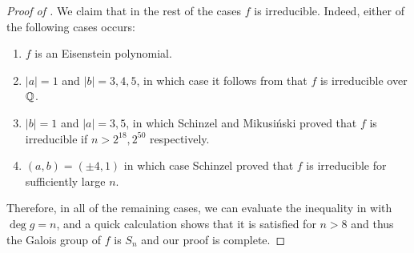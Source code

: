 \documentclass[../main.tex]{subfiles}
\begin{document}
\begin{proof}[Proof of ]
  We claim that in the rest of the cases $f$ is irreducible.
  Indeed, either of the following cases occurs:
  \begin{enumerate}
    \item $f$ is an Eisenstein polynomial.
    \item $\left| a \right| = 1$ and $\left| b \right| = 3,4,5$, in which case it follows from  that $f$ is irreducible over $\mathbb{Q}$.
    \item $\left| b \right| = 1$ and $\left| a \right| = 3,5$, in which Schinzel and Mikusi{\'n}ski \cite{Schinzel1964} proved that $f$ is irreducible if $n > 2^{18}, 2^{50}$ respectively.
    \item $\left( a,b \right) = \left( \pm 4, 1 \right)$ in which case Schinzel \cite{schinzel_1966} proved that $f$ is irreducible for sufficiently large $n$.
  \end{enumerate} 
  Therefore, in all of the remaining cases, we can evaluate the inequality in  with $\deg g = n$, and a quick calculation shows that it is satisfied for $n > 8$ and thus the Galois group of $f$ is $S_n$ and our proof is complete.
\end{proof}
\end{document}
